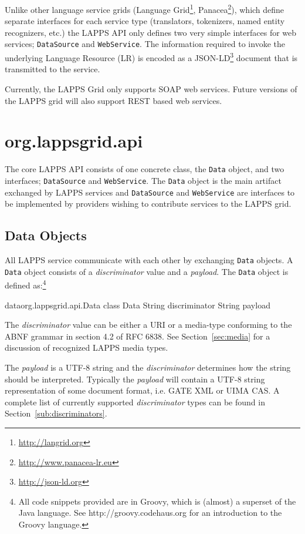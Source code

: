 \documentclass{article}
\newcommand{\lapps}{LAPPS\xspace}
\newcommand{\data}{\texttt{Data}\xspace}
\newcommand{\source}{\texttt{DataSource}\xspace}
\newcommand{\service}{\texttt{WebService}\xspace}
\begin{document}
Unlike other language service grids (Language Grid\footnote{\url{http://langrid.org}}, Panacea\footnote{\url{http://www.panacea-lr.eu}}), which define separate interfaces for each service type (translators, tokenizers, named entity recognizers, etc.) the \lapps API only defines two very simple interfaces for web services; \source and \service. The information required to invoke the underlying Language Resource (LR) is encoded as a JSON-LD\footnote{\url{http://json-ld.org}} document that is transmitted to the service.

Currently, the \lapps Grid only supports SOAP\cite{soap} web services. Future versions of the \lapps grid will also support REST based web services.


\section{org.lappsgrid.api}

The core  \lapps  API consists of one concrete class, the \data  object, and two interfaces; \source and \service.  The \data object is the main artifact exchanged by \lapps services and \source and \service are interfaces to be implemented by providers wishing to contribute services to the \lapps grid.  

\subsection{Data Objects}
All \lapps service communicate with each other by exchanging \data objects.  A \data object consists of a \emph{discriminator} value and a \emph{payload}.  The \data object is defined as:\footnote{All code snippets provided are in Groovy, which is (almost) a superset of the Java language.  See http://groovy.codehaus.org for an introduction to the Groovy language.}

\begin{groovy}{data}{org.lappsgrid.api.Data}
	class Data {
		String discriminator
		String payload
	}
\end{groovy}

The \emph{discriminator} value can be either a URI or a media-type conforming to the ABNF grammar in section 4.2 of RFC 6838\cite{rfc6838}. See Section~\ref{sec:media} for a discussion of recognized \lapps media types.

The \emph{payload} is a UTF-8 string and the \emph{discriminator} determines how the string should be interpreted.  Typically the \emph{payload} will contain a UTF-8 string representation of some document format, i.e. GATE XML or UIMA CAS.  A complete list of currently supported \emph{discriminator} types can be found in Section~\ref{sub:discriminators}. 
\end{document}

